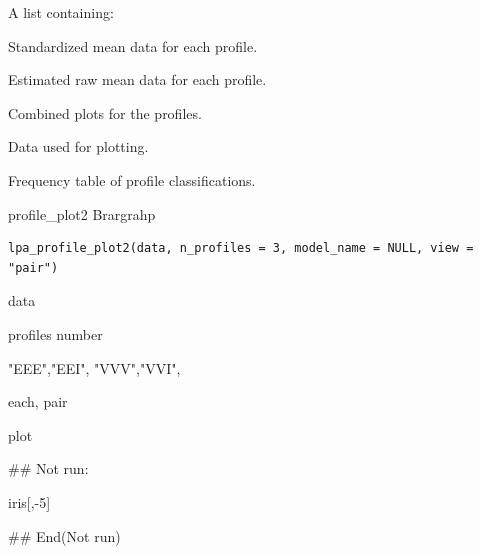 \documentclass[a4paper]{book}
\begin{document}
%
\begin{Value}
A list containing:
\begin{ldescription}
\item[\code{std}] Standardized mean data for each profile.
\item[\code{est}] Estimated raw mean data for each profile.
\item[\code{graph}] Combined plots for the profiles.
\item[\code{plot\_data}] Data used for plotting.
\item[\code{Class\_freq}] Frequency table of profile classifications.
\end{ldescription}
\end{Value}
%
\begin{Examples}
\end{Examples}

%
\begin{Description}
profile\_plot2 Brargrahp
\end{Description}
%
\begin{Usage}
\begin{verbatim}
lpa_profile_plot2(data, n_profiles = 3, model_name = NULL, view = "pair")
\end{verbatim}
\end{Usage}
%
\begin{Arguments}
\begin{ldescription}
\item[\code{data}] data

\item[\code{n\_profiles}] profiles number

\item[\code{model\_name}] "EEE","EEI", "VVV","VVI",

\item[\code{view}] each, pair
\end{ldescription}
\end{Arguments}
%
\begin{Value}
plot
\end{Value}
%
\begin{Examples}
\begin{ExampleCode}

\#\# Not run: 

iris[,-5] %


## End(Not run)


\end{ExampleCode}
\end{Examples}
\end{document}
